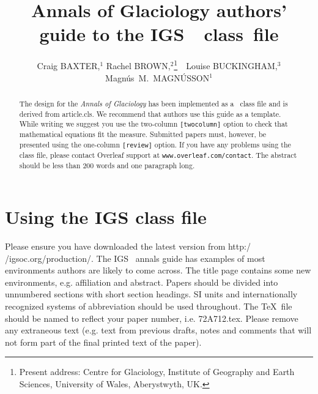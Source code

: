 \documentclass[review,aog]{igs}
\begin{document}
\title[IGS \LaTeXe\ guide]{Annals of Glaciology 
  authors' guide to the IGS~\LaTeXe~class~file}

\author[Baxter and others]{Craig BAXTER,$^1$
  Rachel BROWN,$^2$\protect\thanks{Present address:
  Centre for Glaciology, Institute of Geography and
  Earth Sciences, University of Wales, Aberystwyth,
  UK.}\ \ Louise BUCKINGHAM,$^3$ 
  Magn\'us~M.~MAGN\'USSON$^1$}


\begin{frontmatter}

\maketitle

\begin{abstract}
The design for the \emph{Annals of Glaciology} has been implemented as a \LaTeXe\ class file and is derived from article.cls. We recommend that authors use this guide as a template. While writing we suggest you use the two-column \texttt{[twocolumn]} option to check that mathematical equations fit the measure. Submitted papers must, however, be presented using the one-column \texttt{[review]} option. If you have any problems using the class file, please contact Overleaf support at \texttt{www.overleaf.com/contact}. The abstract should be less than 200 words and one paragraph long.
\end{abstract}

\end{frontmatter}


\section{Using the IGS class file}
Please ensure you have downloaded the latest version from http:/$\!$/igsoc.org/production/. The IGS \LaTeXe\ annals guide has examples of most environments authors are likely to come across. The title page contains some new environments, e.g. affiliation and abstract. Papers should be divided into unnumbered sections with short section headings. SI units and internationally recognized systems of abbreviation should be used throughout. The \TeX\ file should be named to reflect your paper number, i.e. 72A712.tex. Please remove any extraneous text (e.g. text from previous drafts, notes and comments that will not form part of the final printed text of the paper).
\end{document}
